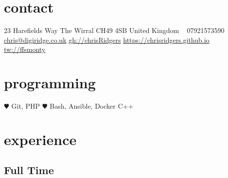 \documentclass[]{friggeri-cv} %
\begin{document}


\begin{aside} %
\section{contact}
23 Harefields Way
The Wirral
CH49 4SB
United Kingdom
~
07921573590
~
\href{mailto:chris@digiridge.co.uk}{chris@digiridge.co.uk}
\href{https://github.com/chrisRidgers}{gh://chrisRidgers}
\href{https://chrisridgers.github.io}{https://chrisridgers.github.io}
\href{http://twitter.com/ffsmonty}{tw://ffsmonty}
\section{programming}
{\large \color{red} $\varheartsuit$} Git, PHP
{\color{red} $\varheartsuit$} Bash, Ansible, Docker
C++
\end{aside}


\section{experience}

\subsection{Full Time}
\end{document}
